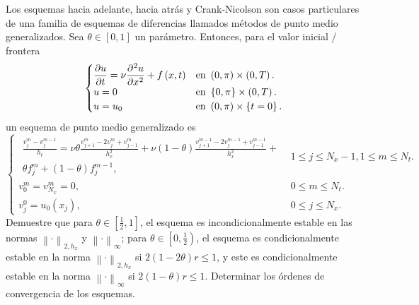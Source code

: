 \begin{questions}
	Los esquemas hacia adelante, hacia atrás y Crank-Nicolson son
	casos particulares de una familia de esquemas de diferencias llamados
	métodos de punto medio generalizados.
	Sea $\theta\in\left[0,1\right]$ un parámetro.
	Entonces, para el valor inicial / frontera
	\begin{equation}\label{eq:heatPDE}
		\begin{cases}\displaystyle
			\diffp{u}{t}=
			\nu\diffp[2]{u}{x}+
			f\left(x,t\right) &
			\text{en }\left(0,\pi\right)\times\left(0,T\right).   \\
			u=0               &
			\text{en }\left\{0,\pi\right\}\times\left(0,T\right). \\
			u=u_{0}           &
			\text{en }\left(0,\pi\right)\times\left\{t=0\right\}.
		\end{cases}
	\end{equation}
	un esquema de punto medio generalizado es
	\begin{equation}\label{eq:heatPDETheta}
		\begin{cases}\displaystyle
			\begin{split}
				\frac{v^{m}_{j}-v^{m-1}_{j}}{h_{t}}=
				\nu\theta
				\frac{v^{m}_{j+1}-2v^{m}_{j}+v^{m}_{j-1}}{h^{2}_{x}}+
				\nu\left(1-\theta\right)
				\frac{v^{m-1}_{j+1}-2v^{m-1}_{j}+v^{m-1}_{j-1}}{h^{2}_{x}}+ \\
				\theta f^{m}_{j}+
				\left(1-\theta\right)f^{m-1}_{j},
			\end{split} &
			1\leq j\leq N_{x}-1, 1\leq m\leq N_{t}.                                                                                                                          \\
			v^{m}_{0}=v^{m}_{N_{x}}=0,                                                                                                                                     &
			0\leq m\leq N_{t}.                                                                                                                                               \\
			v^{0}_{j}=u_{0}\left(x_{j}\right),                                                                                                                             &
			0\leq j\leq N_{x}.
		\end{cases}
	\end{equation}
	Demuestre que para $\theta\in\left[\frac{1}{2},1\right]$,
	el esquema es incondicionalmente estable en las normas ${\left\|\cdot\right\|}_{2,h_{x}}$ y ${\left\|\cdot\right\|}_{\infty}$;
	para $\theta\in\left[0,\frac{1}{2}\right)$, el esquema es condicionalmente estable en la norma ${\left\|\cdot\right\|}_{2,h_{x}}$
	si $2\left(1-2\theta\right)r\leq 1$, y este es condicionalmente estable en la norma ${\left\|\cdot\right\|}_{\infty}$ si
	$2\left(1-\theta\right)r\leq 1$.
	Determinar los órdenes de convergencia de los esquemas.
\end{questions}

